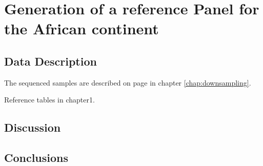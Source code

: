 \chapter{Generation of a reference Panel for the African continent}
\label{chap:reference_panel}



\section{Data Description}
The sequenced samples are described on page \pageref{sec:agv_data_description} in chapter \ref{chap:downsampling}.

Reference tables in chapter1.




\section{Discussion}
\section{Conclusions}